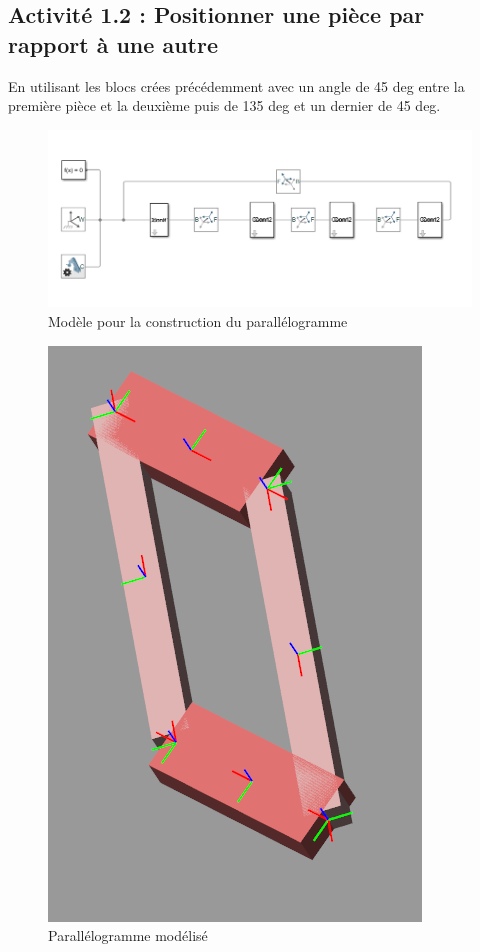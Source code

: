 \documentclass[12pt,a4paper]{article}
\begin{document}
\subsection{Activité 1.2 : Positionner une pièce par rapport à une autre}
En utilisant les blocs crées précédemment avec un angle de 45 deg entre la première pièce et la deuxième puis de 135 deg et un dernier de 45 deg.

\begin{figure}[h!]
\centering
\includegraphics[width=.9\linewidth]{parallelo.png}
\caption{Modèle pour la construction du parallélogramme}
\end{figure}
\begin{figure}[h!]
\centering
\includegraphics[scale=.9]{figure_paralallelo.png}
\caption{Parallélogramme modélisé}
\end{figure}
\newpage
\end{document}
